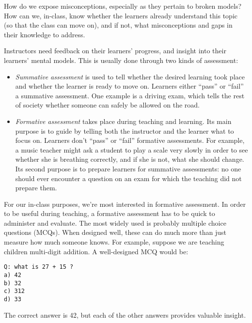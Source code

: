 
How do we expose misconceptions, especially as they pertain to broken
models? How can we, in-class, know whether the learners already
understand this topic (so that the class can move on), and if not, what
misconceptions and gaps in their knowledge to address.

Instructors need feedback on their learners' progress, and insight into
their learners' mental models. This is usually done through two kinds of
assessment:

\begin{itemize}
\item
  \emph{Summative assessment} is used to tell whether the desired
  learning took place and whether the learner is ready to move on.
  Learners either ``pass'' or ``fail'' a summative assessment. One
  example is a driving exam, which tells the rest of society whether
  someone can safely be allowed on the road.
\item
  \emph{Formative assessment} takes place during teaching and learning.
  Its main purpose is to guide by telling both the instructor and the
  learner what to focus on. Learners don't ``pass'' or ``fail''
  formative assessments. For example, a music teacher might ask a
  student to play a scale very slowly in order to see whether she is
  breathing correctly, and if she is not, what she should change. Its
  second purpose is to prepare learners for summative assessments: no
  one should ever encounter a question on an exam for which the teaching
  did not prepare them.
\end{itemize}

For our in-class purposes, we're most interested in formative
assessment. In order to be useful during teaching, a formative
assessment has to be quick to administer and evaluate. The most widely
used is probably multiple choice questions (MCQs). When designed well,
these can do much more than just measure how much someone knows. For
example, suppose we are teaching children multi-digit addition. A
well-designed MCQ would be:

\begin{verbatim}
Q: what is 27 + 15 ?
a) 42
b) 32
c) 312
d) 33
\end{verbatim}

The correct answer is 42, but each of the other answers provides
valuable insight.

